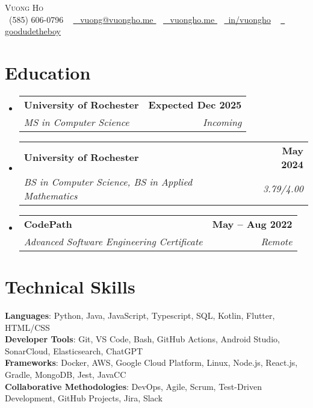 \documentclass[letterpaper,11pt]{article}
\makeatletter
\newcommand{\resumeSubheading}[4]{
  \vspace{-2pt}\item
    \begin{tabular*}{1.0\textwidth}[t]{l@{\extracolsep{\fill}}r}
      \textbf{#1} & \textbf{\small #2} \\
      \textit{\small#3} & \textit{\small #4} \\
    \end{tabular*}\vspace{-7pt}
}
\newcommand{\resumeSubHeadingListStart}{\begin{itemize}[leftmargin=0.0in, label={}]}
\newcommand{\resumeSubHeadingListEnd}{\end{itemize}}
\makeatother
\begin{document}
\begin{center}
  {\Huge \scshape Vuong Ho} \\ \vspace{1pt}
  \small \raisebox{-0.1\height}
  \faPhone\ (585) 606-0796
  ~ \href{mailto:vuong@vuongho.me}{\raisebox{-0.2\height} \faEnvelope\ \underline{ vuong@vuongho.me }}
  ~ \href{https://vuongho.me}{\raisebox{-0.2\height} \faHome\ \underline{ vuongho.me }}
  ~ \href{https://linkedin.com/in/vuongho}{\raisebox{-0.2\height} \faLinkedin\ \underline{in/vuongho}}
  ~ \href{https://github.com/goodudetheboy}{\raisebox{-0.2\height} \faGithub\ \underline{ goodudetheboy }}
  \vspace{-8pt}
\end{center}


\section{Education}
  \resumeSubHeadingListStart
  
    \resumeSubheading
      { University of Rochester }{ Expected Dec 2025 }
      { MS in Computer Science } { Incoming }
  
    \resumeSubheading
      { University of Rochester }{ May 2024 }
      { BS in Computer Science, BS in Applied Mathematics } { 3.79/4.00 }
  
    \resumeSubheading
      { CodePath }{ May -- Aug 2022 }
      { Advanced Software Engineering Certificate } { Remote }
  
  \resumeSubHeadingListEnd

\section{Technical Skills}
 \begin{itemize}[leftmargin=0.15in, label={}]
    \small{\item{
     \textbf{Languages}{: Python, Java, JavaScript, Typescript, SQL, Kotlin, Flutter, HTML/CSS} \\
     \textbf{Developer Tools}{: Git, VS Code, Bash, GitHub Actions, Android Studio, SonarCloud, Elasticsearch, ChatGPT} \\
     \textbf{Frameworks}{: Docker, AWS, Google Cloud Platform, Linux, Node.js, React.js, Gradle, MongoDB, Jest, JavaCC} \\
     \textbf{Collaborative Methodologies}{: DevOps, Agile, Scrum, Test-Driven Development, GitHub Projects, Jira, Slack} \\
    }}
 \end{itemize}
 \vspace{-16pt}
\end{document}
